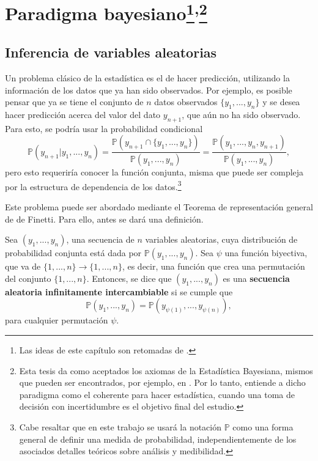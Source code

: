\chapter[Paradigma bayesiano]{Paradigma bayesiano\footnote{Las ideas de este cap\'itulo son retomadas de \cite{Denison_BayesMethods}.}\textsuperscript{,}\footnote{Esta tesis da como aceptados los axiomas de la Estad\'istica Bayesiana, mismos que pueden ser encontrados, por ejemplo, en \cite{Fishburn_Axioms}. Por lo tanto, entiende a dicho paradigma como el coherente para hacer estad\'istica, cuando una toma de decisi\'on con incertidumbre es el objetivo final del estudio. 
}}

\section{Inferencia de variables aleatorias}

Un problema clásico de la estad\'istica es el de hacer predicci\'on, utilizando la informaci\'on de los datos que ya han sido observados. Por ejemplo, es posible pensar que ya se tiene el conjunto de $n$ datos observados $\{y_1, ..., y_n\}$ y se desea hacer predicci\'on acerca del valor del dato $y_{n+1}$, que a\'un no ha sido observado. Para esto, se podr\'ia usar la probabilidad condicional
\begin{equation*}
    \mathbb{P}(y_{n+1}|y_1,...,y_n) =
    \frac{\mathbb{P}(y_{n+1} \cap \{y_1, ..., y_n\})}{\mathbb{P}(y_1, ..., y_n)} =
    \frac{\mathbb{P}(y_1, ..., y_n,y_{n+1})}{\mathbb{P}(y_1, ..., y_n)},
\end{equation*}
pero esto requerir\'ia conocer la funci\'on conjunta, misma que puede ser compleja por la estructura de dependencia de los datos.\footnote{Cabe resaltar que en este trabajo se usar\'a la notaci\'on $\mathbb{P}$ como una forma general de definir una medida de probabilidad, independientemente de los asociados detalles te\'oricos sobre an\'alisis y medibilidad.}

Este problema puede ser abordado mediante el Teorema de representaci\'on general de de Finetti. Para ello, antes se dar\'a una definici\'on.

\begin{defin*}
    Sea $(y_1,...,y_n)$, una secuencia de $n$ variables aleatorias, cuya distribuci\'on de probabilidad conjunta est\'a dada por $\mathbb{P}(y_1,...,y_n)$. Sea $\psi$ una funci\'on biyectiva, que va de $\{1,...,n\} \rightarrow \{1,...,n\}$, es decir, una funci\'on que crea una permutaci\'on del conjunto $\{1,...,n\}$.  
    Entonces, se dice que $(y_1,...,y_n)$ es una \textbf{secuencia aleatoria infinitamente intercambiable} si se cumple que 
    \begin{equation*}
        \mathbb{P}(y_1,...,y_n) = \mathbb{P}(y_{\psi(1)},...,y_{\psi(n)}),
    \end{equation*}
    para cualquier permutaci\'on $\psi$.
\end{defin*}

